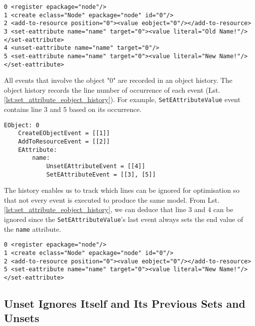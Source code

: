 \begin{lstlisting}[style=cbp-xml,caption={The generated change-based representation of Lst. \ref{lst:set_attribute_eol}. },label=lst:set_attribute_cbp]
0 <register epackage="node"/>
1 <create eclass="Node" epackage="node" id="0"/>
2 <add-to-resource position="0"><value eobject="0"/></add-to-resource>
3 <set-eattribute name="name" target="0"><value literal="Old Name!"/></set-eattribute>
4 <unset-eattribute name="name" target="0"/>
5 <set-eattribute name="name" target="0"><value literal="New Name!"/></set-eattribute>
\end{lstlisting}

All events that involve the object "0" are recorded in an object history. The object history records the line number of occurrence of each event (Lst. \ref{lst:set_attribute_eobject_history}). For example, \texttt{SetEAttributeValue} event contains line 3 and 5 based on its occurrence. 

\begin{lstlisting}[style=cbp-xml,caption={The event-line relationships recorded by an EObjectHistory of Lst. \ref{lst:set_attribute_eol}. },label=lst:set_attribute_eobject_history]
EObject: 0
    CreateEObjectEvent = [[1]]
    AddToResourceEvent = [[2]]
    EAttribute:
        name:
            UnsetEAttributeEvent = [[4]]
            SetEAttributeEvent = [[3], [5]]
\end{lstlisting}

The history enables us to track which lines can be ignored for optimisation so that not every event is executed to produce the same model. From Lst. \ref{lst:set_attribute_eobject_history}, we can deduce that line 3 and 4 can be ignored since the \texttt{SetEAttributeValue}'s last event always sets the end value of the \texttt{name} attribute. 

\begin{lstlisting}[style=cbp-xml,caption={The optimised change-based Representation of Lst. \ref{lst:set_attribute_eol}. },label=lst:set_attribute_optimised_cbp]
0 <register epackage="node"/>
1 <create eclass="Node" epackage="node" id="0"/>
2 <add-to-resource position="0"><value eobject="0"/></add-to-resource>
5 <set-eattribute name="name" target="0"><value literal="New Name!"/></set-eattribute>
\end{lstlisting}

\subsection{Unset Ignores Itself and Its Previous Sets and Unsets}


